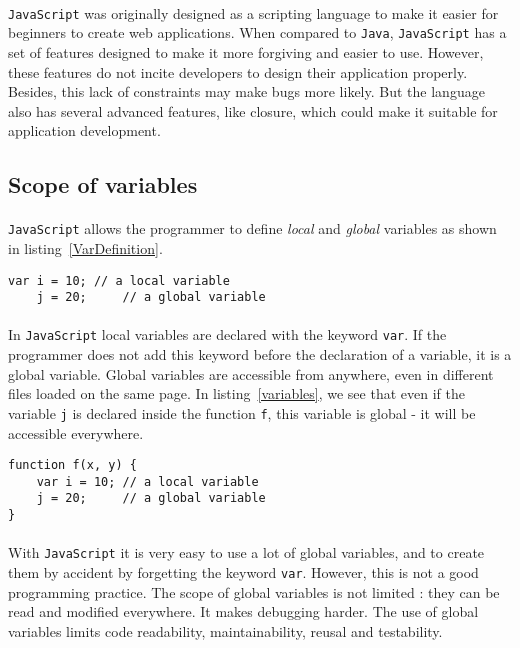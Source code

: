\paragraph{} 
\texttt{JavaScript} was originally designed as a scripting language to make it easier for beginners to create web applications. When compared to \texttt{Java}, \texttt{JavaScript} has a set of features designed to make it more forgiving and easier to use. However, these features do not incite developers to design their application properly. Besides, this lack of constraints may make bugs more likely. But the language also has several advanced features, like closure, which could make it suitable for application development.

\subsection{Scope of variables}

\paragraph{}
\texttt{JavaScript} allows the programmer to define \emph{local} and \emph{global} variables as shown in listing~\ref{VarDefinition}.
\begin{lstlisting}[caption={Defining variables}, label={VarDefinition}]
    var i = 10; // a local variable
    j = 20;     // a global variable
\end{lstlisting}

\paragraph{}
In \texttt{JavaScript} local variables are declared with the keyword \texttt{var}. If the programmer does not add this keyword before the declaration of a variable, it is a global variable. Global variables are accessible from anywhere, even in different files loaded on the same page. In listing~\ref{variables}, we see that even if the variable \texttt{j} is declared inside the function \texttt{f}, this variable is global - it will be accessible everywhere.  
\begin{lstlisting}[caption={Global and local variables}, label={variables}]
function f(x, y) {
    var i = 10; // a local variable
    j = 20;     // a global variable
}
\end{lstlisting}

\paragraph{}
With \texttt{JavaScript} it is very easy to use a lot of global variables, and to create them by accident by forgetting the keyword \texttt{var}. However, this is not a good programming practice. The scope of global variables is not limited : they can be read and modified everywhere. It makes debugging harder. The use of global variables limits code readability, maintainability, reusal and testability.

